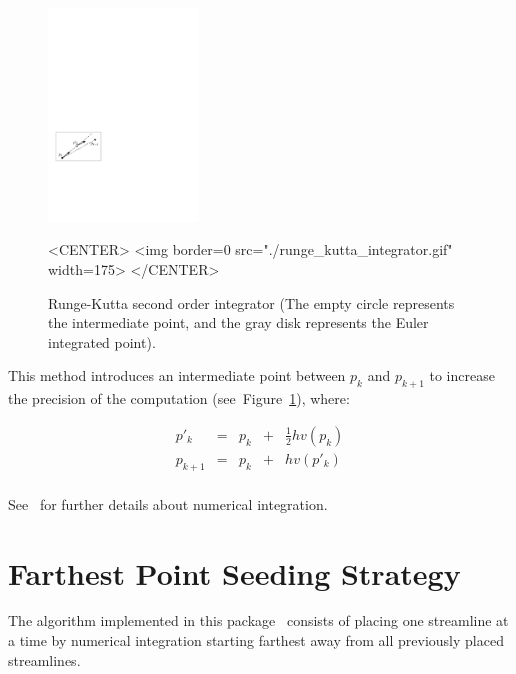 \begin{figure}[h!]
\begin{ccTexOnly}
\begin{center}
\includegraphics[width=4cm]{Stream_lines_2/runge_kutta_integrator}
\end{center}
\end{ccTexOnly}
\begin{ccHtmlOnly}
<CENTER>
<img border=0 src="./runge_kutta_integrator.gif" width=175>
</CENTER>
\end{ccHtmlOnly}
\begin{center}
\caption{Runge-Kutta second order integrator (The empty circle represents the intermediate point, and the gray disk represents the Euler integrated point).
\label{runge_kutta_fig}}
\end{center}
\end{figure}

This method introduces an intermediate point  between $p_k$ and $p_{k+1}$ to increase the
precision of the computation (see~Figure~\ref{runge_kutta_fig}), where:

$$
\begin{array}{ccccc}
    p'_k    & = & p_k & + & \frac{1}{2}hv(p_k) \\
    p_{k+1} & = & p_k & + & hv(p'_k)        \\
   \end{array}
$$

See~\cite{cgal:ptvf-nrcpp-02} for further details about numerical
integration.

\section{Farthest Point Seeding Strategy}
\label{Section_2D_Streamlines_Strategy}

The algorithm implemented in this package~\cite{cgal:mad-fpsep-05}
consists of placing one streamline at a time by numerical integration
starting farthest away from all previously placed
streamlines.\\


